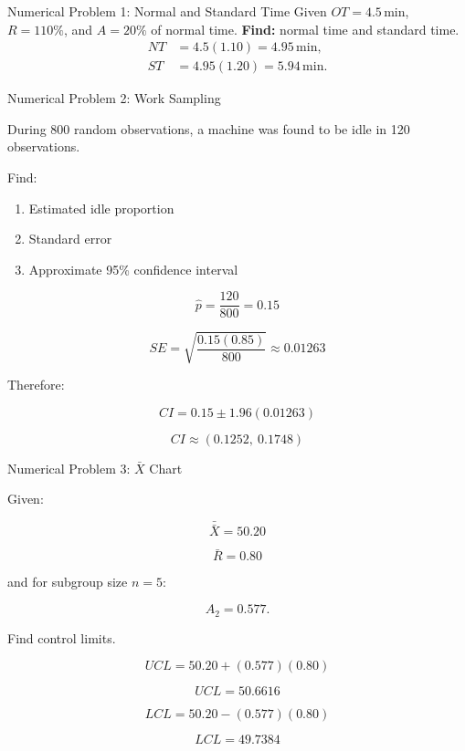 \documentclass[aspectratio=169,10pt]{beamer}
\begin{document}
\begin{frame}{Numerical Problem 1: Normal and Standard Time}
\small
Given $OT=4.5\,\mathrm{min}$, $R=110\%$, and $A=20\%$ of normal time.
\textbf{Find:} normal time and standard time.
\begin{align*}
NT&=4.5(1.10)=4.95\,\mathrm{min},\\
ST&=4.95(1.20)=5.94\,\mathrm{min}.
\end{align*}
\begin{center}\end{center}
\end{frame}


\begin{frame}[shrink=18]{Numerical Problem 2: Work Sampling}
\small

During 800 random observations, a machine was found to be idle
in 120 observations.

Find:

\begin{enumerate}
    \item Estimated idle proportion
    \item Standard error
    \item Approximate 95\% confidence interval
\end{enumerate}

\vspace{4pt}

\[
\hat p=\frac{120}{800}=0.15
\]

\[
SE=
\sqrt{
\frac{0.15(0.85)}{800}
}
\approx0.01263
\]

Therefore:

\[
CI=
0.15\pm1.96(0.01263)
\]

\[
\boxed{
CI\approx(0.1252,\ 0.1748)
}
\]

\end{frame}


\begin{frame}[shrink=18]{Numerical Problem 3: $\bar X$ Chart}
\small

Given:

\[
\bar{\bar X}=50.20
\]

\[
\bar R=0.80
\]

and for subgroup size \(n=5\):

\[
A_2=0.577.
\]

Find control limits.

\vspace{4pt}

\[
UCL=
50.20+(0.577)(0.80)
\]

\[
\boxed{
UCL=50.6616
}
\]

\[
LCL=
50.20-(0.577)(0.80)
\]

\[
\boxed{
LCL=49.7384
}
\]

\end{frame}
\end{document}
